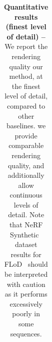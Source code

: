 \begin{table}[!t]
{\begin{tabular}{lccccccccc}
    \end{tabular}
  }
  \caption[Quantitative comparison between \clog and chosen baselines under the finest level of detail]{
    \textbf{Quantitative results (finest level of detail) --}
    We report the rendering quality our method, at the finest level of detail,
    compared to other baselines.
    we provide comparable rendering quality, and additionally allow continuous levels of detail.
    Note that NeRF Synthetic~\cite{mildenhall2020nerf} dataset results for
    FLoD~\cite{seo2024flod} should be interpreted with caution as it performs
    excessively poorly in some sequences.
  }
  \label{tab:clog-quantitative}
\end{table}
